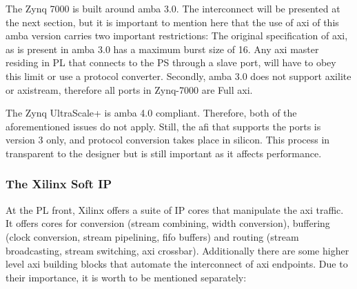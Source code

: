 The Zynq 7000 is built around \gls{amba} 3.0. 
The interconnect will be presented at the next section,
but it is important to mention here that 
the use of \gls{axi} of this \gls{amba} version
carries two important restrictions: 
The original specification of \gls{axi},
as is present in \gls{amba} 3.0 has a maximum \gls{burst} size of 16. 
Any \gls{axi} master residing in PL that connects to the PS through a slave port,
will have to obey this limit or use a protocol converter.
Secondly, \gls{amba} 3.0 does not support \gls{axilite} or \gls{axistream}, 
therefore all ports in Zynq-7000 are Full \gls{axi}.

The Zynq UltraScale+ is \gls{amba} 4.0 compliant. 
Therefore, both of the aforementioned issues do not apply.
Still, the \gls{afi} that supports the  ports is version 3 only,
and protocol conversion takes place in silicon. 
This process in transparent to the designer but is still important
as it affects performance.

\subsubsection{The Xilinx Soft IP}
\label{sect:xilinx-ip}

At the PL front, Xilinx offers a suite of 
IP cores that manipulate the \gls{axi} traffic.
It offers cores for conversion (stream combining, 
width conversion), buffering (clock conversion,
stream pipelining, \gls{fifo} buffers) and routing 
(stream broadcasting, stream switching, \gls{axi} crossbar).
Additionally there are some higher level \gls{axi} building blocks
that automate the interconnect of \gls{axi} endpoints. 
Due to their importance, it is worth to be mentioned separately:

